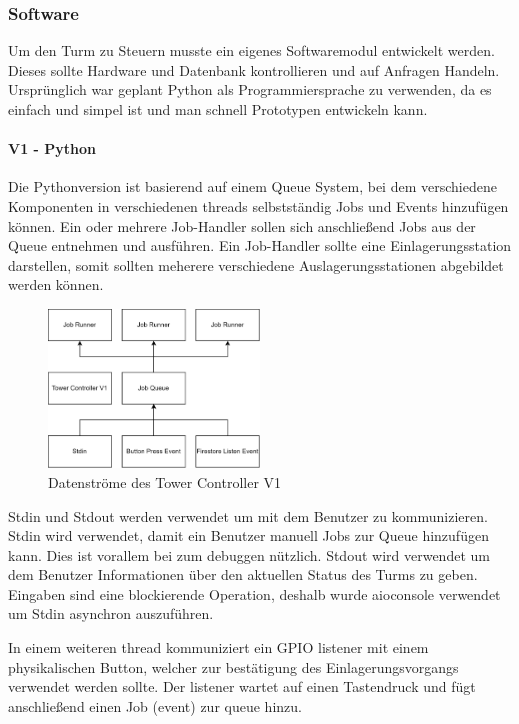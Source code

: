 \subsubsection{Software}

Um den Turm zu Steuern musste ein eigenes Softwaremodul entwickelt werden. Dieses sollte Hardware und Datenbank kontrollieren und auf Anfragen Handeln. Ursprünglich war geplant Python als Programmiersprache zu verwenden, da es einfach und simpel ist und man schnell Prototypen entwickeln kann.


\paragraph{V1 - Python}
Die Pythonversion ist basierend auf einem Queue System, bei dem verschiedene Komponenten in verschiedenen \Glspl{thread} selbstständig Jobs und Events hinzufügen können. Ein oder mehrere Job-Handler sollen sich anschließend Jobs aus der Queue entnehmen und ausführen. Ein Job-Handler sollte eine Einlagerungsstation darstellen, somit sollten meherere verschiedene Auslagerungsstationen abgebildet werden können.

\begin{figure}
  \centering
  \includegraphics[width=0.5\textwidth]{images/tower_controller_v1.png}
  \caption{Datenströme des Tower Controller V1}
  \label{fig:tower_controller_v1}
\end{figure}

\ac{Stdin} und \ac{Stdout} werden verwendet um mit dem Benutzer zu kommunizieren. \ac{Stdin} wird verwendet, damit ein Benutzer manuell Jobs zur Queue hinzufügen kann. Dies ist vorallem bei zum \Gls{debuggen} nützlich. \ac{Stdout} wird verwendet um dem Benutzer Informationen über den aktuellen Status des Turms zu geben. Eingaben sind eine blockierende Operation, deshalb wurde aioconsole verwendet um \ac{Stdin} asynchron auszuführen.

In einem weiteren \Gls{thread} kommuniziert ein \ac{GPIO} \Gls{listener} mit einem physikalischen Button, welcher zur bestätigung des Einlagerungsvorgangs verwendet werden sollte. Der \Gls{listener} wartet auf einen Tastendruck und fügt anschließend einen Job (\Gls{event}) zur \Gls{queue} hinzu.


